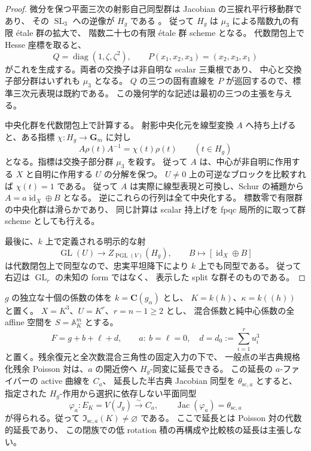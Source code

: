 \begin{proof}
微分を保つ平面三次の射影自己同型群は Jacobian の三捩れ平行移動群であり、
その $\operatorname{SL}_3$ への逆像が $H_g$ である
\cite[Lemma~2.3 の証明、Section~9.5]{NFMFisherTernary}。
従って $H_g$ は $\mu_3$ による階数九の有限 étale 群の拡大で、
階数二十七の有限 étale 群 scheme となる。
代数閉包上で Hesse 座標を取ると、
\[
 Q=\operatorname{diag}(1,\zeta,\zeta^2),\qquad
 P(x_1,x_2,x_3)=(x_2,x_3,x_1)
\]
がこれを生成する。両者の交換子は非自明な scalar 三乗根であり、
中心と交換子部分群はいずれも $\mu_3$ となる。
$Q$ の三つの固有直線を $P$ が巡回するので、標準三次元表現は既約である。
この幾何学的な記述は最初の三つの主張を与える。

中央化群を代数閉包上で計算する。
射影中央化元を線型変換 $A$ へ持ち上げると、ある指標
$\chi:H_g\to\mathbf G_m$ に対し
\[
 A\rho(t)A^{-1}=\chi(t)\rho(t)
 \qquad(t\in H_g)
\]
となる。指標は交換子部分群 $\mu_3$ を殺す。
従って $A$ は、中心が非自明に作用する $X$ と自明に作用する $U$ の分解を保つ。
$U\ne0$ 上の可逆なブロックを比較すれば $\chi(t)=1$ である。
従って $A$ は実際に線型表現と可換し、Schur の補題から
$A=a\operatorname{id}_X\oplus B$ となる。
逆にこれらの行列は全て中央化する。
標数零で有限群の中央化群は滑らかであり、
同じ計算は scalar 持上げを fpqc 局所的に取って群 scheme としても行える。

最後に、$k$ 上で定義される明示的な射
\[
 \operatorname{GL}(U)\longrightarrow Z_{\operatorname{PGL}(V)}(H_g),
 \qquad B\longmapsto[\operatorname{id}_X\oplus B]
\]
は代数閉包上で同型なので、忠実平坦降下により $k$ 上でも同型である。
従って右辺は $\operatorname{GL}_r$ の未知の form ではなく、
表示した split な群そのものである。
\end{proof}

\begin{proposition}
\label{prop:nfm-heisenberg-special-plane-isom}
$g$ の独立な十個の係数の体を $k=\mathbf C(g_\alpha)$ とし、
$K=k(h)$、$\kappa=k((h))$ と置く。
$X=K^3$、$U=K^r$、$r=n-1\ge2$ とし、
混合係数と純中心係数の全 affine 空間を $S=\mathbb A_K^m$ とする。
\[
 F=g+b+\ell+d,\qquad
 a:\ b=\ell=0,\quad d=d_0:=\sum_{i=1}^r u_i^3
\]
と置く。残余復元と全次数混合三角性の固定入力の下で、
一般点の半古典規格化残余 Poisson 対は、$a$ の開近傍へ
$H_g$-同変に延長できる。
この延長の $a$-ファイバーの active 曲線を $C_a$、
延長した半古典 Jacobian 同型を $\theta_{\mathrm{sc},a}$ とすると、
指定された $H_g$-作用から選択に依存しない平面同型
\[
 \varphi_a:E_K=V(J_g)\xrightarrow{\sim}C_a,\qquad
 \operatorname{Jac}(\varphi_a)=\theta_{\mathrm{sc},a}
\]
が得られる。従って $\mathfrak I_{\mathrm{sc},a}(K)\ne\varnothing$ である。
ここで延長とは Poisson 対の代数的延長であり、
この閉族での低 rotation 積の再構成や比較核の延長は主張しない。
\end{proposition}


